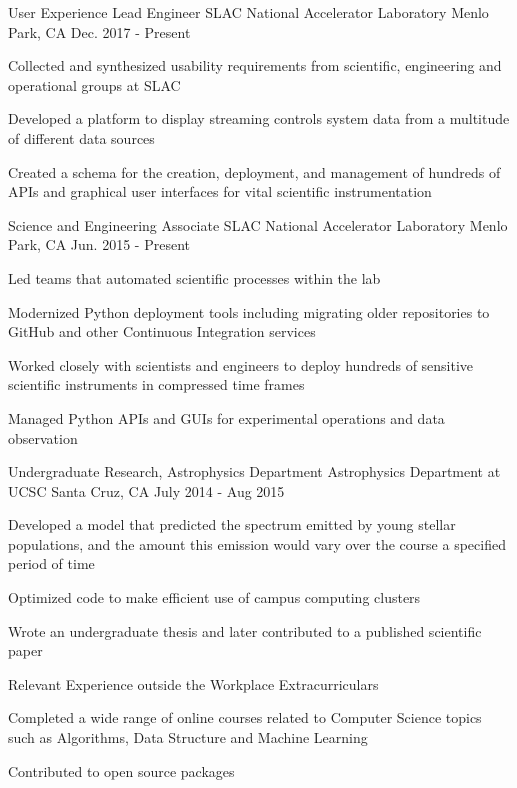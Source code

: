 \begin{cventries}
  \cventry
    {User Experience Lead Engineer}
    {SLAC National Accelerator Laboratory}
    {Menlo Park, CA}
    {Dec. 2017 - Present}
    {
      \begin{cvitems}
        \item {Collected and synthesized usability requirements from scientific, engineering
               and operational groups at SLAC}
        \item {Developed a platform to display streaming controls system data
               from a multitude of different data sources}
        \item {Created a schema for the creation, deployment, and management of
               hundreds of APIs and graphical user interfaces for vital scientific
               instrumentation}
    \end{cvitems}
    }
  \cventry
    {Science and Engineering Associate}
    {SLAC National Accelerator Laboratory}
    {Menlo Park, CA}
    {Jun. 2015 - Present}
    {
      \begin{cvitems}
        \item {Led teams that automated scientific processes within the lab}
        \item {Modernized Python deployment tools including migrating older
               repositories to GitHub and other Continuous Integration
               services}
        \item {Worked closely with scientists and engineers to deploy hundreds
               of sensitive scientific instruments in compressed time frames}
        \item {Managed Python APIs and GUIs for experimental operations and
               data observation} 
    \end{cvitems}
    }
  \cventry
    {Undergraduate Research, Astrophysics Department}
    {Astrophysics Department at UCSC}
    {Santa Cruz, CA}
    {July 2014 - Aug 2015}
    {
      \begin{cvitems}
        \item {Developed a model that predicted the spectrum emitted by young
               stellar populations, and the amount this emission would vary
               over the course a specified period of time}
        \item {Optimized code to make efficient use of campus computing
               clusters}
        \item {Wrote an undergraduate thesis and later contributed to a
               published scientific paper}
      \end{cvitems}
      }
  \cventry
    {Relevant Experience outside the Workplace}
    {Extracurriculars}
    {}
    {}
    {
      \begin{cvitems}
        \item {Completed a wide range of online courses related to Computer
               Science topics such as Algorithms, Data Structure and Machine
               Learning}
        \item {Contributed to open source packages}
      \end{cvitems}
      }
\end{cventries}
